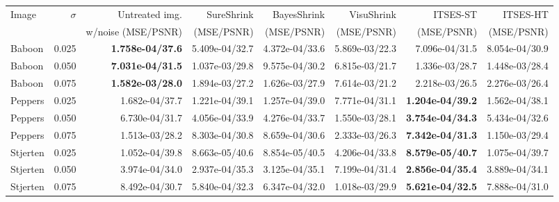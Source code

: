   
\begin{tabular}{l|r|rrrrrr}
	\toprule
	Image &  $\sigma$ &  Untreated img.  &      SureShrink &   BayesShrink &    VisuShrink &  ITSES-ST &  ITSES-HT \\
	&&w/noise (MSE/PSNR)&(MSE/PSNR)&(MSE/PSNR)&(MSE/PSNR)&(MSE/PSNR)&(MSE/PSNR)\\
\midrule
  Baboon &     0.025 & \textbf{1.758e-04/37.6} & 5.409e-04/32.7 & 4.372e-04/33.6 & 5.869e-03/22.3 &          7.096e-04/31.5 & 8.054e-04/30.9 \\
  Baboon &     0.050 & \textbf{7.031e-04/31.5} & 1.037e-03/29.8 & 9.575e-04/30.2 & 6.815e-03/21.7 &          1.336e-03/28.7 & 1.448e-03/28.4 \\
  Baboon &     0.075 & \textbf{1.582e-03/28.0} & 1.894e-03/27.2 & 1.626e-03/27.9 & 7.614e-03/21.2 &          2.218e-03/26.5 & 2.276e-03/26.4 \\
 Peppers &     0.025 & 1.682e-04/37.7 & 1.221e-04/39.1 &          1.257e-04/39.0 & 7.771e-04/31.1 & \textbf{1.204e-04/39.2} & 1.562e-04/38.1 \\
 Peppers &     0.050 & 6.730e-04/31.7 & 4.056e-04/33.9 &          4.276e-04/33.7 & 1.550e-03/28.1 & \textbf{3.754e-04/34.3} & 5.434e-04/32.6 \\
 Peppers &     0.075 & 1.513e-03/28.2 & 8.303e-04/30.8 &          8.659e-04/30.6 & 2.333e-03/26.3 & \textbf{7.342e-04/31.3} & 1.150e-03/29.4 \\
Stjerten &     0.025 & 1.052e-04/39.8 & 8.663e-05/40.6 &          8.854e-05/40.5 & 4.206e-04/33.8 & \textbf{8.579e-05/40.7} & 1.075e-04/39.7 \\
Stjerten &     0.050 & 3.974e-04/34.0 & 2.937e-04/35.3 &          3.125e-04/35.1 & 7.199e-04/31.4 & \textbf{2.856e-04/35.4} & 3.889e-04/34.1 \\
Stjerten &     0.075 & 8.492e-04/30.7 & 5.840e-04/32.3 &          6.347e-04/32.0 & 1.018e-03/29.9 & \textbf{5.621e-04/32.5} & 7.888e-04/31.0 \\
\bottomrule
\end{tabular}
